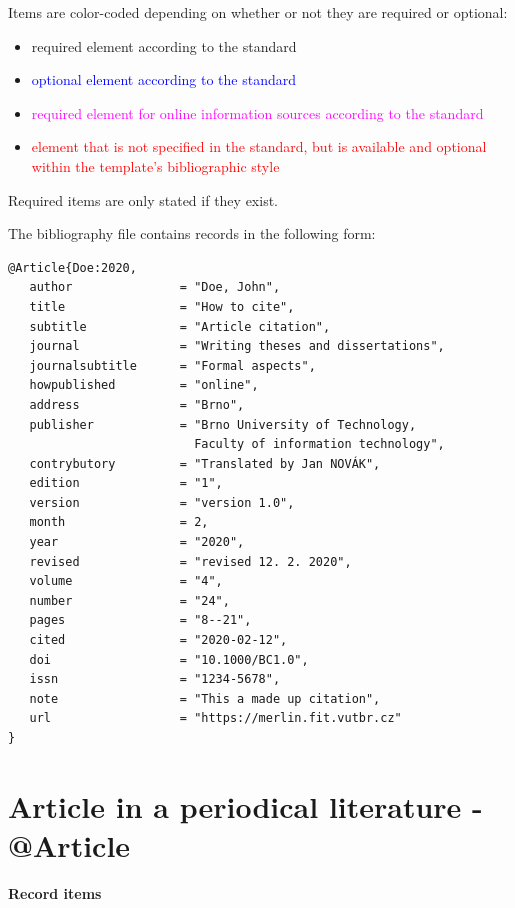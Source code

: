 \noindent Items are color-coded depending on whether or not they are required or optional:
\begin{itemize}
    \item required element according to the standard
    \item \textcolor{blue}{optional element according to the standard}
    \item \textcolor{magenta}{required element for online information sources according to the standard}
    \item \textcolor{red}{element that is not specified in the standard, but is available and optional within the template's bibliographic style}
\end{itemize}
Required items are only stated if they exist.

\newpage
The bibliography file contains records in the following form:
\begin{verbatim}
@Article{Doe:2020,
   author               = "Doe, John",
   title                = "How to cite",
   subtitle             = "Article citation",
   journal              = "Writing theses and dissertations",
   journalsubtitle      = "Formal aspects",
   howpublished         = "online",
   address              = "Brno",
   publisher            = "Brno University of Technology, 
                          Faculty of information technology",
   contrybutory         = "Translated by Jan NOVÁK",
   edition              = "1",
   version              = "version 1.0",
   month                = 2,
   year                 = "2020",
   revised              = "revised 12. 2. 2020",
   volume               = "4",
   number               = "24",
   pages                = "8--21",
   cited                = "2020-02-12",
   doi                  = "10.1000/BC1.0",
   issn                 = "1234-5678",
   note                 = "This a made up citation",
   url                  = "https://merlin.fit.vutbr.cz"
}
\end{verbatim}


\newpage
\section*{Article in a periodical literature - @Article}
\label{pr-casopis-clanek}
\noindent \textbf{Record items}

\medskip

